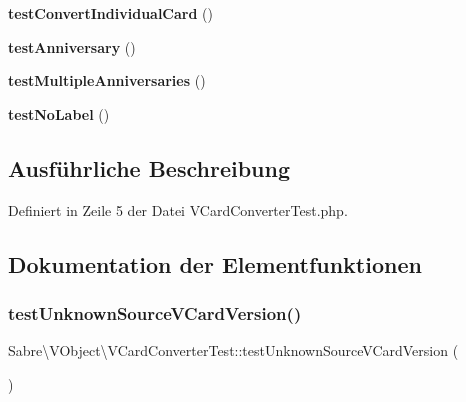 \begin{DoxyCompactItemize}
\item 
\mbox{\label{class_sabre_1_1_v_object_1_1_v_card_converter_test_aa041dd380178fd0a2c78e8860c98ae0e}} 
{\bfseries test\+Convert\+Individual\+Card} ()
\item 
\mbox{\label{class_sabre_1_1_v_object_1_1_v_card_converter_test_a54441aa2ca0680685588165dcb9e1054}} 
{\bfseries test\+Anniversary} ()
\item 
\mbox{\label{class_sabre_1_1_v_object_1_1_v_card_converter_test_a9b66c7a5bcbb601422b03870dc7cce98}} 
{\bfseries test\+Multiple\+Anniversaries} ()
\item 
\mbox{\label{class_sabre_1_1_v_object_1_1_v_card_converter_test_a57b4c3858f632c4f4bf37f23be961e09}} 
{\bfseries test\+No\+Label} ()
\end{DoxyCompactItemize}


\subsection{Ausführliche Beschreibung}


Definiert in Zeile 5 der Datei V\+Card\+Converter\+Test.\+php.



\subsection{Dokumentation der Elementfunktionen}
\mbox{\label{class_sabre_1_1_v_object_1_1_v_card_converter_test_ab10af4f925dd2f83c5ab7aa7d08f40ab}} 
\subsubsection{\texorpdfstring{test\+Unknown\+Source\+V\+Card\+Version()}{testUnknownSourceVCardVersion()}}
{\footnotesize\ttfamily Sabre\textbackslash{}\+V\+Object\textbackslash{}\+V\+Card\+Converter\+Test\+::test\+Unknown\+Source\+V\+Card\+Version (\begin{DoxyParamCaption}{ }\end{DoxyParamCaption})}

